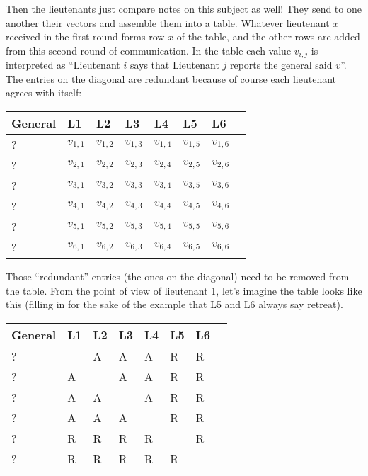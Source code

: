 Then the lieutenants just compare notes on this subject as well! They send to one another their vectors and assemble them into a table. Whatever lieutenant $x$ received in the first round forms row $x$ of the table, and the other rows are added from this second round of communication. In the table each value $v_{i,j}$ is interpreted as ``Lieutenant $i$ says that Lieutenant $j$ reports the general said $v$''. The entries on the diagonal are redundant because of course each lieutenant agrees with itself:

\begin{center}
	\begin{tabular}{|l|l|l|l|l|l|l|l|}
		\hline
		General & L1        & L2        & L3        & L4        & L5        & L6        \\
		\hline
		?       & $v_{1,1}$ & $v_{1,2}$ & $v_{1,3}$ & $v_{1,4}$ & $v_{1,5}$ & $v_{1,6}$ \\\hline
		?       & $v_{2,1}$ & $v_{2,2}$ & $v_{2,3}$ & $v_{2,4}$ & $v_{2,5}$ & $v_{2,6}$ \\\hline
		?       & $v_{3,1}$ & $v_{3,2}$ & $v_{3,3}$ & $v_{3,4}$ & $v_{3,5}$ & $v_{3,6}$ \\\hline
		?       & $v_{4,1}$ & $v_{4,2}$ & $v_{4,3}$ & $v_{4,4}$ & $v_{4,5}$ & $v_{4,6}$ \\\hline
		?       & $v_{5,1}$ & $v_{5,2}$ & $v_{5,3}$ & $v_{5,4}$ & $v_{5,5}$ & $v_{5,6}$ \\\hline
		?       & $v_{6,1}$ & $v_{6,2}$ & $v_{6,3}$ & $v_{6,4}$ & $v_{6,5}$ & $v_{6,6}$ \\\hline
	\end{tabular}
\end{center}

Those ``redundant'' entries (the ones on the diagonal) need to be removed from the table. From the point of view of lieutenant 1, let's imagine the table looks like this (filling in for the sake of the example that L5 and L6 always say retreat).
\begin{center}
	\begin{tabular}{|l|l|l|l|l|l|l|l|}
		\hline
		General & L1 & L2 & L3 & L4 & L5 & L6 \\
		\hline
		?       & ~  & A  & A  & A  & R  & R  \\ \hline
		?       & A  & ~  & A  & A  & R  & R  \\ \hline
		?       & A  & A  & ~  & A  & R  & R  \\ \hline
		?       & A  & A  & A  & ~  & R  & R  \\ \hline
		?       & R  & R  & R  & R  & ~  & R  \\ \hline
		?       & R  & R  & R  & R  & R  & ~  \\ \hline
	\end{tabular}
\end{center}

